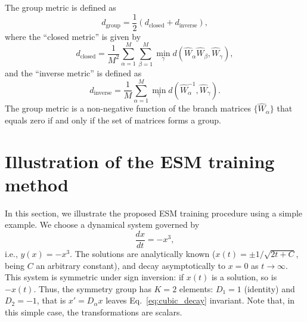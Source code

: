The group metric is defined as
\begin{equation}
  \label{eq:d_group} d_{\mathrm{group}} = \frac{1}{2} \left( d_{\mathrm{closed}} + d_{\mathrm{inverse}} \right),
\end{equation}
where the ``closed metric'' is given by
\begin{equation}
  \label{eq:d_clo} d_{\mathrm{closed}} = \frac{1}{M^2} \sum_{\alpha = 1}^M \sum_{\beta = 1}^M \min_{\gamma} d \left( \hat{W}_{\alpha} \hat{W}_{\beta} , \hat{W}_{\gamma} \right),
\end{equation}
and the ``inverse metric'' is defined as
\begin{equation}
  \label{eq:d_inv} d_{\mathrm{inverse}} = \frac{1}{M} \sum_{\alpha = 1}^M \min_{\gamma} d \left( \hat{W}_{\alpha}^{-1} , \hat{W}_{\gamma} \right).
\end{equation}
The group metric is a non-negative function of the branch matrices $\{ \hat{W}_{\alpha} \}$ that equals zero if and only if the set of matrices forms a group.



\section{Illustration of the ESM training method}\label{sec:ESM_proc}




In this section, we illustrate the proposed ESM training procedure using a simple example. We choose a dynamical system governed by
\begin{equation}\label{eq:cubic_decay}
  \frac{dx}{dt} = -x^3,
\end{equation}
i.e., $y(x) = -x^3$. The solutions are analytically known ($x(t)=\pm 1/\sqrt{2t + C}$, being $C$ an arbitrary constant), and decay asymptotically to $x=0$ as $t \rightarrow \infty$. This system is symmetric under sign inversion: if $x(t)$ is a solution, so is $-x(t)$. Thus, the symmetry group has $K=2$ elements: $D_1 = 1$ (identity) and $D_2 = -1$, that is $x' = D_{\alpha}x$ leaves Eq.~\ref{eq:cubic_decay} invariant. Note that, in this simple case, the transformations are scalars.


